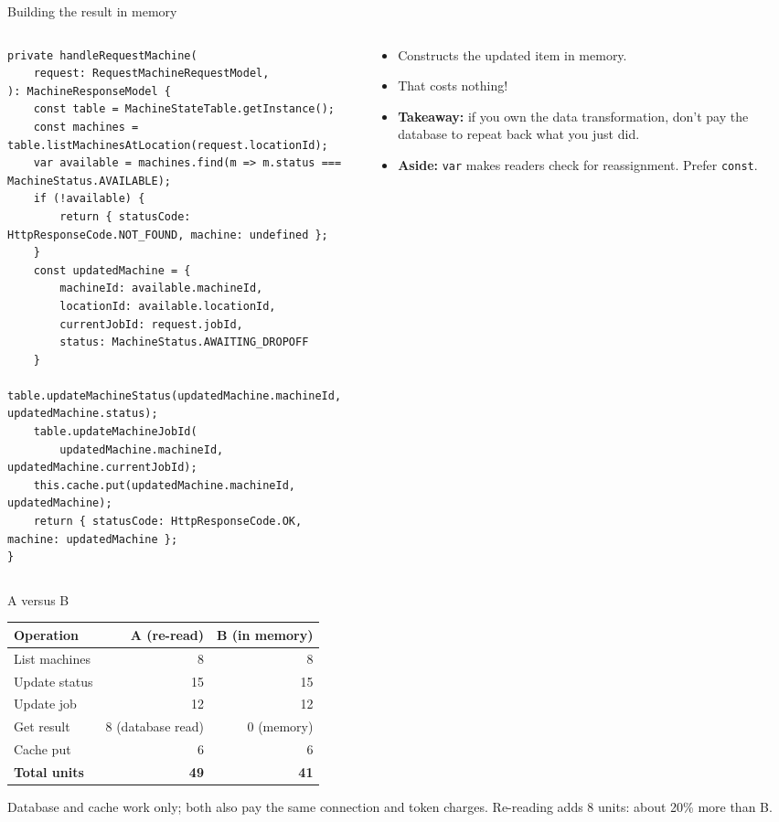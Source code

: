 \documentclass[aspectratio=169]{beamer}
\newenvironment{sample}[1]
  {\samplelabel{#1}\begin{columns}[T]\begin{column}{0.66\textwidth}}
  {\end{column}\end{columns}}
\newcommand{\review}{\end{column}\begin{column}{0.31\textwidth}\footnotesize}
\begin{document}
\begin{frame}[fragile]{Building the result in memory}
\begin{sample}{B}
\begin{lstlisting}
private handleRequestMachine(
    request: RequestMachineRequestModel,
): MachineResponseModel {
    const table = MachineStateTable.getInstance();
    const machines = table.listMachinesAtLocation(request.locationId);
    var available = machines.find(m => m.status === MachineStatus.AVAILABLE);
    if (!available) {
        return { statusCode: HttpResponseCode.NOT_FOUND, machine: undefined };
    }
    const updatedMachine = {
        machineId: available.machineId,
        locationId: available.locationId,
        currentJobId: request.jobId,
        status: MachineStatus.AWAITING_DROPOFF
    }
    table.updateMachineStatus(updatedMachine.machineId, updatedMachine.status);
    table.updateMachineJobId(
        updatedMachine.machineId, updatedMachine.currentJobId);
    this.cache.put(updatedMachine.machineId, updatedMachine);
    return { statusCode: HttpResponseCode.OK, machine: updatedMachine };
}
\end{lstlisting}
\review
\begin{itemize}
  \item<2-> Constructs the updated item in memory.
  \item<2-> That costs nothing!
  \item<3-> \textbf{Takeaway:} if you own the data transformation, don't pay the database to
    repeat back what you just did.
  \item<4-> \textbf{Aside:} \texttt{var} makes readers check for reassignment. Prefer
    \texttt{const}.
\end{itemize}
\end{sample}
\end{frame}

\begin{frame}{A versus B}
  \centering
  \begin{tabular}{@{}lrr@{}}
    \toprule
    Operation & A (re-read) & B (in memory) \\
    \midrule
    List machines & 8 & 8 \\
    Update status & 15 & 15 \\
    Update job & 12 & 12 \\
    Get result & 8 (database read) & 0 (memory) \\
    Cache put & 6 & 6 \\
    \midrule
    \textbf{Total units} & \textbf{49} & \textbf{41} \\
    \bottomrule
  \end{tabular}

  \bigskip
  Database and cache work only; both also pay the same connection and token charges.
  Re-reading adds 8 units: about 20\% more than B.
\end{frame}
\end{document}
